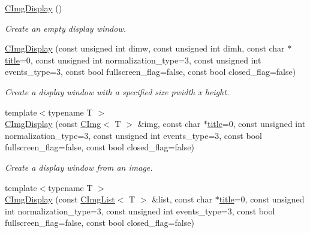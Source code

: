 \begin{DoxyCompactItemize}
\item 
\hypertarget{structcimg__library_1_1_c_img_display_acc67139c6af7ecc3e6eb4964a6b3a07f}{\hyperlink{structcimg__library_1_1_c_img_display_acc67139c6af7ecc3e6eb4964a6b3a07f}{C\-Img\-Display} ()}\label{structcimg__library_1_1_c_img_display_acc67139c6af7ecc3e6eb4964a6b3a07f}

\begin{DoxyCompactList}\small\item\em Create an empty display window. \end{DoxyCompactList}\item 
\hyperlink{structcimg__library_1_1_c_img_display_a9fafef6af9930b63632aa41de46ef712}{C\-Img\-Display} (const unsigned int dimw, const unsigned int dimh, const char $\ast$\hyperlink{structcimg__library_1_1_c_img_display_afa41a285232ef89035e1832c7dc92ec1}{title}=0, const unsigned int normalization\-\_\-type=3, const unsigned int events\-\_\-type=3, const bool fullscreen\-\_\-flag=false, const bool closed\-\_\-flag=false)
\begin{DoxyCompactList}\small\item\em Create a display window with a specified size {\ttfamily pwidth} x {\ttfamily height}. \end{DoxyCompactList}\item 
{\footnotesize template$<$typename T $>$ }\\\hyperlink{structcimg__library_1_1_c_img_display_ae39bcb5f695daade887553971972c8f9}{C\-Img\-Display} (const \hyperlink{structcimg__library_1_1_c_img}{C\-Img}$<$ T $>$ \&img, const char $\ast$\hyperlink{structcimg__library_1_1_c_img_display_afa41a285232ef89035e1832c7dc92ec1}{title}=0, const unsigned int normalization\-\_\-type=3, const unsigned int events\-\_\-type=3, const bool fullscreen\-\_\-flag=false, const bool closed\-\_\-flag=false)
\begin{DoxyCompactList}\small\item\em Create a display window from an image. \end{DoxyCompactList}\item 
{\footnotesize template$<$typename T $>$ }\\\hyperlink{structcimg__library_1_1_c_img_display_a02ddf061bd7c4dbf3b28d8d5787778e7}{C\-Img\-Display} (const \hyperlink{structcimg__library_1_1_c_img_list}{C\-Img\-List}$<$ T $>$ \&list, const char $\ast$\hyperlink{structcimg__library_1_1_c_img_display_afa41a285232ef89035e1832c7dc92ec1}{title}=0, const unsigned int normalization\-\_\-type=3, const unsigned int events\-\_\-type=3, const bool fullscreen\-\_\-flag=false, const bool closed\-\_\-flag=false)

\end{DoxyCompactItemize}

